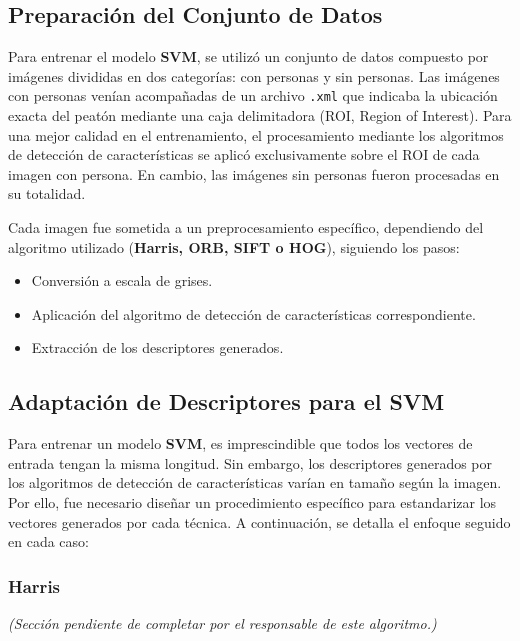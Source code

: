 \documentclass[a4paper]{article}
\begin{document}
\subsection{Preparación del Conjunto de Datos}

Para entrenar el modelo \textbf{SVM}, se utilizó un conjunto de datos compuesto por imágenes divididas en dos categorías: con personas y sin personas. Las imágenes con personas venían acompañadas de un archivo \texttt{.xml} que indicaba la ubicación exacta del peatón mediante una caja delimitadora (ROI, Region of Interest). Para una mejor calidad en el entrenamiento, el procesamiento mediante los algoritmos de detección de características se aplicó exclusivamente sobre el ROI de cada imagen con persona. En cambio, las imágenes sin personas fueron procesadas en su totalidad.

\par\vspace{0.5cm}
Cada imagen fue sometida a un preprocesamiento específico, dependiendo del algoritmo utilizado (\textbf{Harris, ORB, SIFT o HOG}), siguiendo los pasos:
\begin{itemize}
    \item Conversión a escala de grises.
    \item Aplicación del algoritmo de detección de características correspondiente.
    \item Extracción de los descriptores generados.
\end{itemize}

\subsection{Adaptación de Descriptores para el SVM}

Para entrenar un modelo \textbf{SVM}, es imprescindible que todos los vectores de entrada tengan la misma longitud. Sin embargo, los descriptores generados por los algoritmos de detección de características varían en tamaño según la imagen. Por ello, fue necesario diseñar un procedimiento específico para estandarizar los vectores generados por cada técnica. A continuación, se detalla el enfoque seguido en cada caso:

\subsubsection*{Harris}

\textit{(Sección pendiente de completar por el responsable de este algoritmo.)}
\end{document}
